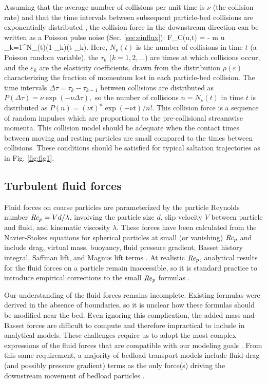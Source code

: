 Assuming that the average number of collisions per unit time is $\nu$ (the collision rate) and that the time intervals between subsequent particle-bed collisions are exponentially distributed \citep[e.g.][]{Gordon1972}, the collision force in the downstream direction can be written as a Poisson pulse noise (Sec. \ref{sec:einflux}):
\be F_C(u,t) = - m u \sum_{k=1}^{N_\nu(t)}(1-\varepsilon_k)\delta(t-\tau_k). \label{eq:col} \ee
Here, $N_\nu(t)$ is the number of collisions in time $t$ (a Poisson random variable), the $\tau_k$ ($k=1,2,\dots$) are times at which collisions occur, and the $\varepsilon_k$ are the elasticity coefficients, drawn from the distribution $\rho(\varepsilon)$ characterizing the fraction of momentum lost in each particle-bed collision.
The time intervals $\Delta \tau = \tau_k-\tau_{k-1}$ between collisions are distributed as $P(\Delta \tau) = \nu \exp(-\nu\Delta \tau),$ so the number of collisions $n=N_\nu(t)$ in time $t$ is distributed as $P(n) = (\nu t)^n\exp(-\nu t)/n! .$
This collision force is a sequence of random impulses which are proportional to the pre-collisional streamwise momenta. This collision model should be adequate when the contact times between moving and resting particles are small compared to the times between collisions. These conditions should be satisfied for typical saltation trajectories as in Fig. \ref{fig:fig1}.

\subsection{Turbulent fluid forces}

Fluid forces on coarse particles are parameterized by the particle Reynolds number $\mbox{\textit{Re}}_p = V d/\lambda$, involving the particle size $d$, slip velocity $V$ between particle and fluid, and kinematic viscosity $\lambda$.
These forces have been calculated from the Navier-Stokes equations for spherical particles at small (or vanishing) $\mbox{\textit{Re}}_p$ and include drag, virtual mass, buoyancy, fluid pressure gradient, Basset history integral, Saffman lift, and Magnus lift terms \citep{Hjelmfelt1966, Maxey1983, Auton1987}.
At realistic $\mbox{\textit{Re}}_p$, analytical results for the fluid forces on a particle remain inaccessible, so it is standard practice to introduce empirical corrections to the small $\mbox{\textit{Re}}_p$ formulas \citep[e.g.][]{Clift1978,Schmeeckle2007}.

Our understanding of the fluid forces remains incomplete.
Existing formulas were derived in the absence of boundaries, so it is unclear how these formulas should be modified near the bed.
Even ignoring this complication, the added mass and Basset forces are difficult to compute and therefore impractical to include in analytical models.
These challenges require us to adopt the most complex expressions of the fluid forces that are compatible with our modeling goals \citep[e.g.][]{Michaelides1997,Armenio2001}.
From this same requirement, a majority of bedload transport models include fluid drag (and possibly pressure gradient) terms as the only force(s) driving the downstream movement of bedload particles \citep{Ancey2014,Fan2014,Schmeeckle2014,Gonzalez2017,Elghannay2017}.

